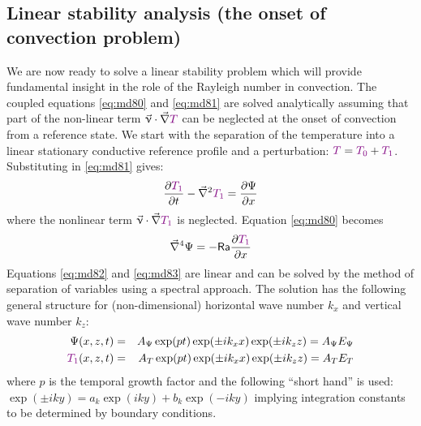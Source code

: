 \vspace{0.5cm}
\vspace{0.5cm}


\subsection{Linear stability analysis (the onset of convection problem)}

We are now ready to solve a linear stability problem which will provide fundamental
insight in the role of the Rayleigh number in convection. The coupled equations \eqref{eq:md80} and
\eqref{eq:md81} are solved analytically assuming that part of the non-linear term 
$\vec\upnu\cdot \vec\nabla{\color{violet}T} $ can be
neglected at the onset of convection from a reference state.
We start with the separation of the temperature into a linear stationary conductive
reference profile and a perturbation: 
${\color{violet}T}={\color{violet}T_0}+{\color{violet}T_1}$. Substituting in \eqref{eq:md81} gives:
\begin{equation}
\frac{\partial {\color{violet} T_1}}{\partial t}  - \vec\nabla^2  {\color{violet} T_1}
= \frac{\partial \Psi}{\partial x} 
\label{eq:md82}
\end{equation}
where the nonlinear term $\vec\upnu\cdot \vec\nabla{\color{violet}T_1} $ is neglected. Equation 
\eqref{eq:md80} becomes
\begin{equation}
\vec\nabla^4 \Psi = -{\mathsf{Ra}} \frac{\partial {\color{violet}T_1}}{\partial x} 
\label{eq:md83}
\end{equation}
Equations \eqref{eq:md82} and \eqref{eq:md83} are linear and can be solved by the method of separation of
variables using a spectral approach. The solution has the following general structure for
(non-dimensional) horizontal wave number $k_x$ and vertical wave number $k_z$:
\begin{eqnarray}
\Psi(x,z,t) &=& A_\Psi \exp (pt) \exp (\pm ik_x x) \exp (\pm ik_z z) = A_\Psi E_\Psi \\
{\color{violet}T_1} (x,z,t) &=& A_T \exp (pt) \exp (\pm ik_x x) \exp (\pm ik_z z) = A_T E_T 
\end{eqnarray}
where $p$ is the temporal growth factor and the following ``short hand'' is used:
$\exp (\pm iky) = a_k \exp (iky) + b_k \exp (-iky)$ implying integration constants to be determined by boundary
conditions.

